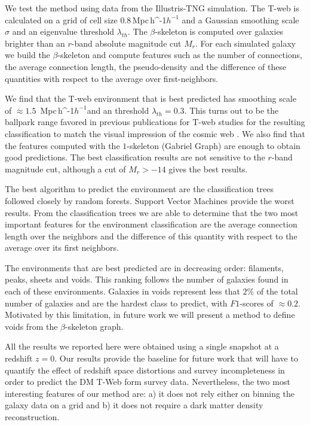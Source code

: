 \documentclass[usenatbib]{mnras}
\newcommand{\Mpch}{\,{\rm Mpc}\,\ifmmode h^{-1}\else $h^{-1}$\fi}
\begin{document}
We test the method using data from the Illustris-TNG simulation.
The T-web is calculated on a grid of cell size $0.8$\Mpch 
and a Gaussian smoothing scale $\sigma$ and an eigenvalue threshold $\lambda_{th}$.
The $\beta$-skeleton is computed over galaxies brighter than 
an $r$-band absolute magnitude cut $M_{r}$.
For each simulated galaxy we build the $\beta$-skeleton and
compute features such as the number of connections, the average connection
length, the pseudo-density and the difference of these quantities with
respect to the average over first-neighbors.

We find that the T-web environment that is best predicted has smoothing
scale of $\approx1.5$ \Mpch and an threshold $\lambda_{th}=0.3$. 
This turns out to be the ballpark range  favored in previous publications
for T-web  studies for the resulting classification to match the visual impression of the cosmic web \citep{Forero-Romero2009}.
We also find that the features computed with the $1$-skeleton 
(Gabriel Graph) are enough to obtain good predictions. 
The best classification results are not sensitive to the $r$-band
magnitude cut, although a cut of $M_r>-14$ gives the best results.

The best algorithm to predict the environment are the classification
trees followed closely by random forests. 
Support Vector Machines provide the worst results.
From the classification trees we are able to determine that the two most
important features for the environment classification are the average
connection length over the neighbors and the difference of this quantity
with respect to the average over its first neighbors.

The environments that are best predicted are in decreasing order: 
filaments, peaks, sheets and voids. 
This ranking follows the number of galaxies found in each of these environments.
Galaxies in voids represent less that $2\%$ of the total number of galaxies and 
are the hardest class to predict, with $F1$-scores of $\approx0.2$.
Motivated by this limitation, in future work we will present a method to define
voids from the $\beta$-skeleton graph.

All the results we reported here were obtained using a single snapshot at a 
redshift $z=0$.
Our results provide the baseline for future work that will have to quantify 
the effect of redshift space distortions and survey incompleteness in order to
predict  the DM T-Web form survey data.
Nevertheless, the two most interesting features of our method are: a) it does not
rely either on binning the galaxy data on a grid and b) it does not require 
a dark matter density reconstruction.
\end{document}
